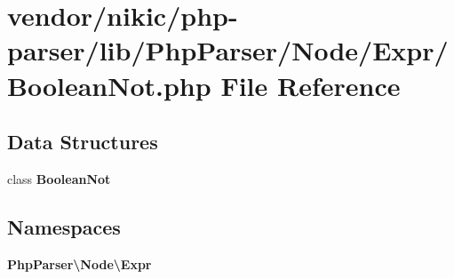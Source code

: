 \section{vendor/nikic/php-\/parser/lib/\+Php\+Parser/\+Node/\+Expr/\+Boolean\+Not.php File Reference}
\label{_boolean_not_8php}
\subsection*{Data Structures}
\begin{DoxyCompactItemize}
\item 
class {\bf Boolean\+Not}
\end{DoxyCompactItemize}
\subsection*{Namespaces}
\begin{DoxyCompactItemize}
\item 
 {\bf Php\+Parser\textbackslash{}\+Node\textbackslash{}\+Expr}
\end{DoxyCompactItemize}
